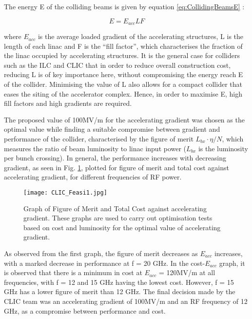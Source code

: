 The energy E of the colliding beams is given by equation \ref{eq:CollidingBeamsE} \cite{CLIC:Concept}:

\begin{equation}
    E = E_{acc} L F
    \label{eq:CollidingBeamsE}
\end{equation}

where $E_{acc}$ is the average loaded gradient of the accelerating structures, L is the length of each linac and F is the ``fill factor'', which characterises the fraction of the linac occupied by accelerating structures. It is the general case for colliders such as the ILC and CLIC that in order to reduce overall construction cost, reducing L is of key importance here, without compromising the energy reach E of the collider. Minimising the value of L also allows for a compact collider that eases the siting of the accelerator complex. Hence, in order to maximise E, high fill factors and high gradients are required.

The proposed value of 100MV/m for the accelerating gradient was chosen as the optimal value while finding a suitable compromise between gradient and performance of the collider, characterised by the figure of merit $L_{bx} \cdot \eta /N$, which measures the ratio of beam luminosity to linac input power ($L_{bx}$ is the luminosity per bunch crossing). In general, the performance increases with decreasing gradient, as seen in Fig. \ref{fig:CLIC:Feasi1}, plotted for figure of merit and total cost against accelerating gradient, for different frequencies of RF power.


\begin{figure}[!htb]
    \centering
    \texttt{[image: CLIC\_Feasi1.jpg]}
    
    \caption{Graph of Figure of Merit and Total Cost against accelerating gradient. These graphs are used to carry out optimisation tests based on cost and luminosity for the optimal value of accelerating gradient. \cite{CLIC:Concept}}
    \label{fig:CLIC:Feasi1}
\end{figure}

As observed from the first graph, the figure of merit decreases as $E_{acc}$ increases, with a marked decrease in performance at f = 20 GHz. In the cost-$E_{acc}$ graph, it is observed that there is a minimum in cost at $E_{acc}$ = 120MV/m at all frequencies, with f = 12 and 15 GHz having the lowest cost. However, f = 15 GHz has a lower figure of merit than 12 GHz. The final decision made by the CLIC team was an accelerating gradient of 100MV/m and an RF frequency of 12 GHz, as a compromise between performance and cost.

